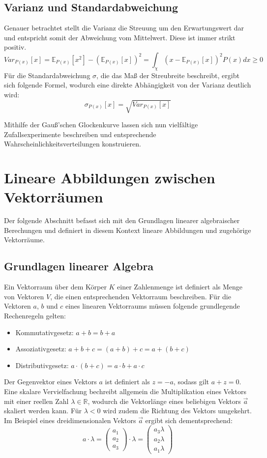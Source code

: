 \documentclass[]{dsadokumentation}
\begin{document}
\subsection{Varianz und Standardabweichung}
Genauer betrachtet stellt die Varianz die Streuung um den Erwartungswert dar und entspricht somit der Abweichung vom Mittelwert. Diese ist immer strikt positiv.
\[ Var _{P(x)} [x] = \mathbb{E} _{P(x)} [x^{2}] - (\mathbb{E} _{P(x)} [x])^{2} = \int_ {\chi} (x - \mathbb{E} _{P(x)} [x])^{2} P(x) dx \geq 0 \]
Für die Standardabweichung $\sigma$, die das Maß der Streubreite beschreibt, ergibt sich folgende Formel, wodurch eine direkte Abhängigkeit von der Varianz deutlich wird:
\[ \sigma _{P(x)} [x] = \sqrt{Var _{P(x)} [x]} \]

Mithilfe der Gauß'schen Glockenkurve lassen sich nun vielfältige Zufallsexperimente beschreiben und entsprechende Wahrscheinlichkeitsverteilungen konstruieren.

\section{Lineare Abbildungen zwischen Vektorräumen}\label{k4.2.ch.linalg}
Der folgende Abschnitt befasst sich mit den Grundlagen linearer algebraischer Berechungen und definiert in diesem Kontext lineare Abbildungen und zugehörige Vektorräume.

\subsection{Grundlagen linearer Algebra}
Ein Vektorraum über dem Körper $K$ einer Zahlenmenge ist definiert als Menge von Vektoren $V$, die einen entsprechenden Vektorraum beschreiben. Für die Vektoren $a$, $b$ und $c$ eines linearen Vektorraums müssen folgende grundlegende Rechenregeln gelten:
\begin{itemize}
\item Kommutativgesetz: $a + b = b + a$
\item Assoziativgesetz: $a + b + c = (a + b) + c = a + (b + c)$
\item Distributivgesetz: $a \cdot (b + c) = a \cdot b + a \cdot c$
\end{itemize}

Der Gegenvektor eines Vektors $a$ ist definiert als $z = -a$, sodass gilt $a + z = 0$. Eine skalare Vervielfachung bechreibt allgemein die Multiplikation eines Vektors mit einer reellen Zahl $\lambda \in \mathbb{R}$, wodurch die Vektorlänge eines beliebigen Vektors $\vec{a}$ skaliert werden kann. Für $\lambda < 0$ wird zudem die Richtung des Vektors umgekehrt. Im Beispiel eines dreidimensionalen Vektors $\vec{a}$ ergibt sich dementsprechend:
\[ a \cdot \lambda = \left(\begin{array}{c} a_1 \\ a_2 \\ a_3 \end{array}\right)\cdot \lambda=\left(\begin{array}{c} a_3 \lambda \\ a_2 \lambda \\ a_1 \lambda \end{array}\right) \]
\end{document}
